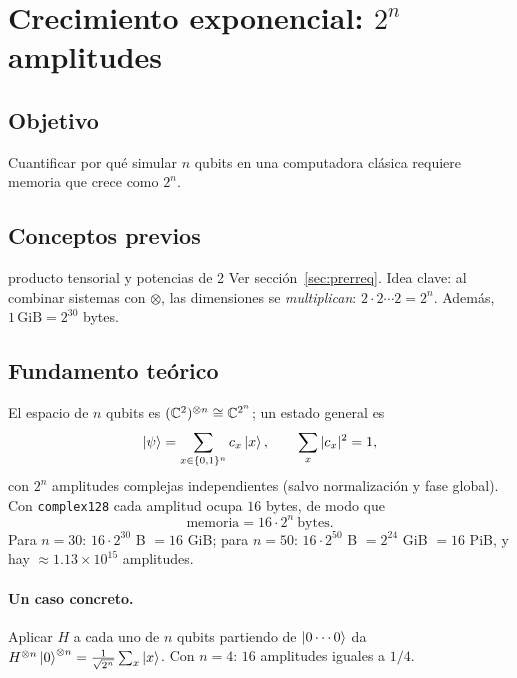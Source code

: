 \def\tituloconcepto{Crecimiento exponencial: $2^n$ amplitudes}


\section{Crecimiento exponencial: $2^n$ amplitudes}

\subsection{Objetivo}
Cuantificar por qué simular $n$ qubits en una computadora clásica requiere
memoria que crece como $2^n$.

\subsection{Conceptos previos}
\begin{concepto}{producto tensorial y potencias de 2}
Ver sección~\ref{sec:prerreq}. Idea clave: al combinar sistemas con
$\otimes$, las dimensiones se \emph{multiplican}: $2\cdot2\cdots2=2^n$. Además,
$1\,\mathrm{GiB}=2^{30}$ bytes.
\end{concepto}

\subsection{Fundamento teórico}
El espacio de $n$ qubits es $(\mathbb{C}^2)^{\otimes n}\cong\mathbb{C}^{2^n}$; un estado
general es
\begin{equation}
  \left|\psi\right\rangle=\sum_{x\in\{0,1\}^n}c_x\left|x\right\rangle,\qquad \sum_x|c_x|^2=1,
\end{equation}
con $2^n$ amplitudes complejas independientes (salvo normalización y fase
global). Con \texttt{complex128} cada amplitud ocupa $16$ bytes, de modo que
\begin{equation}
  \text{memoria}=16\cdot2^n\ \text{bytes}.
\end{equation}
Para $n=30$: $16\cdot2^{30}$ B $=16$ GiB; para $n=50$: $16\cdot2^{50}$ B
$=2^{24}$ GiB $=16$ PiB, y hay $\approx1.13\times10^{15}$ amplitudes.

\paragraph{Un caso concreto.} Aplicar $H$ a cada uno de $n$ qubits partiendo de
$\left|0\cdots0\right\rangle$ da
$H^{\otimes n}\left|0\right\rangle^{\otimes n}=\frac1{\sqrt{2^n}}\sum_x\left|x\right\rangle$. Con $n=4$:
$16$ amplitudes iguales a $1/4$.

